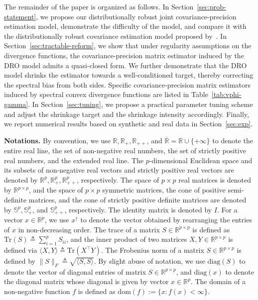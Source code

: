 \documentclass[11pt]{article}
\def\R{\mathbb{R}}
\def\S{\mathbb{S}}
\def\la{\langle}
\def\PSD{{\S^k_{++}}}
\def\ra{\rangle}
\newcommand{\Let}{\triangleq}
\def\diag{\mathrm{diag}}
\def\transpose{\top}
\def\R{\mathbb{R}}
\def\S{\mathbb{S}}
\def\tr{\mathrm{Tr}}
\def\la{\langle}
\def\PSD{{\S^p_{+}}}
\def\PD{{\S^p_{++}}}
\def\ra{\rangle}
\begin{document}
The remainder of the paper is organized as follows.
In Section~\ref{sec:prob-statement}, we propose our distributionally robust joint covariance-precision estimation model, demonstrate the difficulty of the model, and compare it with the distributionally robust covariance estimation model proposed by~\cite{ref:yue2024geometric}. In Section~\ref{sec:tractable-reform}, we show that under regularity assumptions on the divergence functions, the covariance-precision matrix estimator induced by the DRO model admits a quasi-closed form. We further demonstrate that the DRO model shrinks the estimator towards a well-conditioned target, thereby correcting the spectral bias from both sides. Specific covariance-precision matrix estimators induced by spectral convex divergence functions are listed in Table~\ref{tab:vphi-gamma}. In Section~\ref{sec:tuning}, we propose a practical parameter tuning scheme and adjust the shrinkage target and the shrinkage intensity accordingly. Finally, we report numerical results based on synthetic and real data in Section~\ref{sec:exp}.




\noindent \textbf{Notations.} By convention, we use $\R, \R_+, \R_{++}$, and $\overline{\R}=\R\cup \{+\infty\}$ to denote the entire real line, the set of non-negative real numbers, the set of strictly positive real numbers, and the extended real line. The $p$-dimensional Euclidean space and its subsets of non-negative real vectors and strictly positive real vectors are denoted by $\R^p, \R_+^p, \R_{++}^p$, respectively. The space of $p\times p$ real matrices is denoted by $\R^{p\times p}$, and the space of $p\times p$ symmetric matrices, the cone of positive semi-definite matrices, and the cone of strictly positive definite matrices are denoted by $\S^p, \PSD$, and $\PD$, respectively. The identity matrix is denoted by $I$. For a vector $x\in \R^p$, we use $x^{\uparrow}$ to denote the vector obtained by rearranging the entries of $x$ in non-decreasing order. The trace of a matrix $S\in \R^{p\times p}$ is defined as $\tr(S)\Let \sum_{i=1}^p S_{ii}$, and the inner product of two matrices $X,Y\in\R^{p\times p}$ is defined via $\la X, Y\ra \Let \tr(X^\transpose Y)$. The Frobenius norm of a matrix $S\in\R^{p\times p}$ is defined by $\|S\|_F\Let \sqrt{\la S,S\ra}$. By slight abuse of notation, we use $\diag(S)$ to denote the vector of diagonal entries of matrix $S\in \R^{p\times p}$, and $\diag(x)$ to denote the diagonal matrix whose diagonal is given by vector $x\in \R^p$. The domain of a non-negative function $f$ is defined as $\mathrm{dom}(f):=\{x:f(x)<\infty\}$. 
\end{document}
